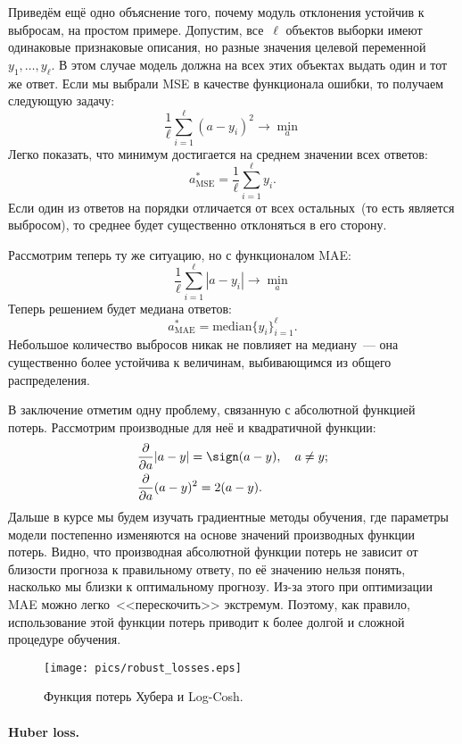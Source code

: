 \documentclass[12pt,fleqn]{article}
\begin{document}
Приведём ещё одно объяснение того, почему модуль отклонения устойчив к выбросам,
на простом примере.
Допустим, все~$\ell$ объектов выборки имеют одинаковые признаковые описания, но разные
значения целевой переменной~$y_1, \dots, y_\ell$.
В этом случае модель должна на всех этих объектах выдать один и тот же ответ.
Если мы выбрали MSE в качестве функционала ошибки, то получаем следующую задачу:
\[
    \frac{1}{\ell}
    \sum_{i = 1}^{\ell} \left(
        a - y_i
    \right)^2
    \to
    \min_a
\]
Легко показать, что минимум достигается на среднем значении всех ответов:
\[
    a_{\text{MSE}}^*
    =
    \frac{1}{\ell}
    \sum_{i = 1}^{\ell}
        y_i.
\]
Если один из ответов на порядки отличается от всех остальных~(то есть является выбросом),
то среднее будет существенно отклоняться в его сторону.

Рассмотрим теперь ту же ситуацию, но с функционалом MAE:
\[
    \frac{1}{\ell}
    \sum_{i = 1}^{\ell} \left|
        a - y_i
    \right|
    \to
    \min_a
\]
Теперь решением будет медиана ответов:
\[
    a_{\text{MAE}}^*
    =
    \text{median}
        \{y_i\}_{i = 1}^{\ell}.
\]
Небольшое количество выбросов никак не повлияет на медиану~--- она существенно
более устойчива к величинам, выбивающимся из общего распределения.

В заключение отметим одну проблему, связанную с абсолютной функцией потерь.
Рассмотрим производные для неё и квадратичной функции:
\begin{align*}
    &\frac{\partial}{\partial a} |a - y| = \sign (a - y), \quad a \neq y; \\
    &\frac{\partial}{\partial a} (a - y)^2 = 2 (a - y).
\end{align*}
Дальше в курсе мы будем изучать градиентные методы обучения,
где параметры модели постепенно изменяются на основе значений производных функции потерь.
Видно, что производная абсолютной функции потерь не зависит от близости прогноза к правильному ответу,
по её значению нельзя понять, насколько мы близки к оптимальному прогнозу.
Из-за этого при оптимизации MAE можно легко~<<перескочить>> экстремум.
Поэтому, как правило, использование этой функции потерь приводит к более долгой и сложной
процедуре обучения.

\begin{figure}[t]
    \centering
    \texttt{[image: pics/robust\_losses.eps]}
    \caption{Функция потерь Хубера и Log-Cosh.}
    \label{fig:robust_losses}
\end{figure}

\paragraph{Huber loss.}
\end{document}
